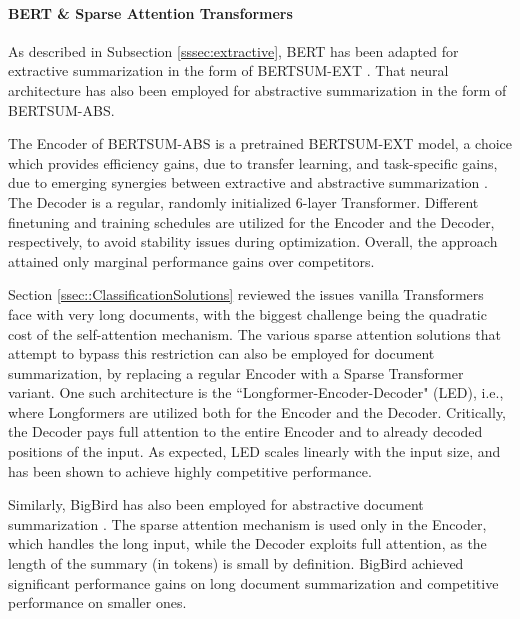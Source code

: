 \documentclass[preprint,review,10pt]{elsarticle}
\begin{document}
	\paragraph{BERT \& Sparse Attention Transformers}  As described in Subsection \ref{sssec:extractive}, BERT has been adapted for extractive summarization in the form of BERTSUM-EXT \cite{lapata_bert}. That neural architecture has also been employed for abstractive summarization in the form of BERTSUM-ABS.
	
	The Encoder of BERTSUM-ABS is a pretrained BERTSUM-EXT model, a choice which provides efficiency gains, due to transfer learning, and task-specific gains, due to emerging synergies between extractive and abstractive summarization \cite{wei2, gehrmann}. The Decoder is a regular, randomly initialized 6-layer Transformer. Different finetuning and training schedules are utilized for the Encoder and the Decoder, respectively, to avoid stability issues during optimization. Overall, the approach attained only marginal performance gains over competitors.
	
	Section \ref{ssec::ClassificationSolutions} reviewed the issues vanilla Transformers face with very long documents, with the biggest challenge being the quadratic cost of the self-attention mechanism. The various sparse attention solutions that attempt to bypass this restriction can also be employed for document summarization, by replacing a regular Encoder with a Sparse Transformer variant. One such architecture is the ``Longformer-Encoder-Decoder" (LED), i.e., where Longformers are utilized both for the Encoder and the Decoder. Critically, the Decoder pays full attention to the entire Encoder and to already decoded positions of the input. As expected, LED scales linearly with the input size, and has been shown to achieve highly competitive performance.
	
	Similarly, BigBird has also been employed for abstractive document summarization \cite{big_bird}. The sparse attention mechanism is used only in the Encoder, which handles the long input, while the Decoder exploits full attention, as the length of the summary (in tokens) is small by definition. BigBird achieved significant performance gains on long document summarization and competitive performance on smaller ones.
	
\end{document}
